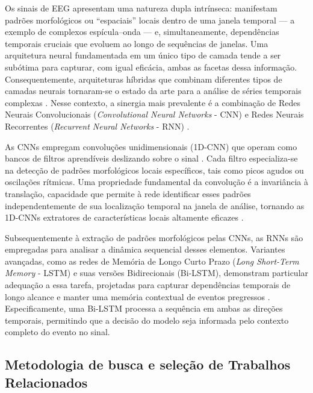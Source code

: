 \documentclass[alpha-refs,brazilian]{CC-EC_TF-TC}
\begin{document}
Os sinais de EEG apresentam uma natureza dupla intrínseca: manifestam padrões morfológicos ou ``espaciais'' locais dentro de uma janela temporal — a exemplo de complexos espícula--onda — e, simultaneamente, dependências temporais cruciais que evoluem ao longo de sequências de janelas. Uma arquitetura neural fundamentada em um único tipo de camada tende a ser subótima para capturar, com igual eficácia, ambas as facetas dessa informação. Consequentemente, arquiteturas híbridas que combinam diferentes tipos de camadas neurais tornaram-se o estado da arte para a análise de séries temporais complexas \citep{Roy2019Deep, Shoeibi2021, Zhang2024Review}. Nesse contexto, a sinergia mais prevalente é a combinação de Redes Neurais Convolucionais (\textit{Convolutional Neural Networks} - CNN) e Redes Neurais Recorrentes (\textit{Recurrent Neural Networks} - RNN) \citep{Roy2019Deep, Shoeibi2021, Zhang2024Review}.

As CNNs empregam convoluções unidimensionais (1D-CNN) que operam como bancos de filtros aprendíveis deslizando sobre o sinal \citep{Shoeibi2021}. Cada filtro especializa-se na detecção de padrões morfológicos locais específicos, tais como picos agudos ou oscilações rítmicas. Uma propriedade fundamental da convolução é a invariância à translação, capacidade que permite à rede identificar esses padrões independentemente de sua localização temporal na janela de análise, tornando as 1D-CNNs extratores de características locais altamente eficazes \citep{Shoeibi2021, Roy2019Deep, Khan2023, Goodfellow2016}.

Subsequentemente à extração de padrões morfológicos pelas CNNs, as RNNs são empregadas para analisar a dinâmica sequencial desses elementos. Variantes avançadas, como as redes de Memória de Longo Curto Prazo (\textit{Long Short-Term Memory} - LSTM) e suas versões Bidirecionais (Bi-LSTM), demonstram particular adequação a essa tarefa, projetadas para capturar dependências temporais de longo alcance e manter uma memória contextual de eventos pregressos \citep{Goodfellow2016, Roy2019Deep}. Especificamente, uma Bi-LSTM processa a sequência em ambas as direções temporais, permitindo que a decisão do modelo seja informada pelo contexto completo do evento no sinal.

\subsection{Metodologia de busca e seleção de Trabalhos Relacionados}
\end{document}

